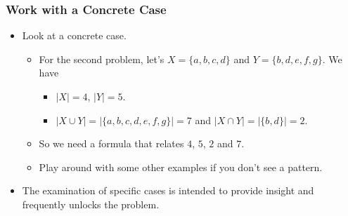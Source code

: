 \documentclass{beamer}
\begin{document}
\begin{frame}%
\frametitle{Work with a Concrete Case}


\begin{itemize}
\item Look at a concrete case.

\begin{itemize}
\item<1-> For the second problem, let's $X = \{a, b, c, d\}$ and $Y = \{b, d, e, f, g\}$. We have%

\begin{itemize}
\item<2-> $|X| = 4$, $|Y| = 5$.

\item<2-> $|X \cup Y| = |\{a, b, c, d, e, f, g\}| = 7$ and $|X \cap Y| = |\{b, d\}| = 2$.

\end{itemize}

\item<3-> So we need a formula that relates $4$, $5$, $2$ and $7$.

\item<3-> Play around with some other examples if you don't see a pattern.

\end{itemize}


\vspace{0.5cm}

\item<4-> The examination of specific cases is intended to provide insight and frequently unlocks the problem.

\end{itemize}

\end{frame}
\end{document}
